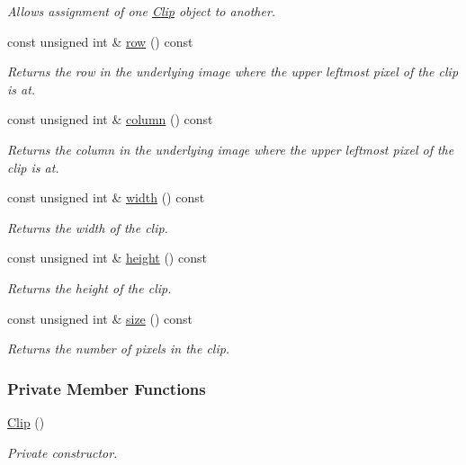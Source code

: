 \begin{CompactItemize}
\begin{CompactList}\small\item\em Allows assignment of one \hyperlink{class_clip}{Clip} object to another. \item\end{CompactList}\item 
const unsigned int \& \hyperlink{class_clip_1a1d1fd626d1325f0f2b9184de4c89b8}{row} () const 
\begin{CompactList}\small\item\em Returns the row in the underlying image where the upper leftmost pixel of the clip is at. \item\end{CompactList}\item 
const unsigned int \& \hyperlink{class_clip_06a34378fa0f23425d10bb04e9972a26}{column} () const 
\begin{CompactList}\small\item\em Returns the column in the underlying image where the upper leftmost pixel of the clip is at. \item\end{CompactList}\item 
const unsigned int \& \hyperlink{class_clip_88d1a47c0ec077e8c6680785509389b0}{width} () const 
\begin{CompactList}\small\item\em Returns the width of the clip. \item\end{CompactList}\item 
const unsigned int \& \hyperlink{class_clip_939908a8dde602d25335792cc0fd5d97}{height} () const 
\begin{CompactList}\small\item\em Returns the height of the clip. \item\end{CompactList}\item 
const unsigned int \& \hyperlink{class_clip_eb6b12a1a0570b529d6a09633b991fcd}{size} () const 
\begin{CompactList}\small\item\em Returns the number of pixels in the clip. \item\end{CompactList}\end{CompactItemize}
\subsubsection*{Private Member Functions}
\begin{CompactItemize}
\item 
\hyperlink{class_clip_313d69fd73a96253cb578d09d20dcbac}{Clip} ()
\begin{CompactList}\small\item\em Private constructor. \item\end{CompactList}\end{CompactItemize}
